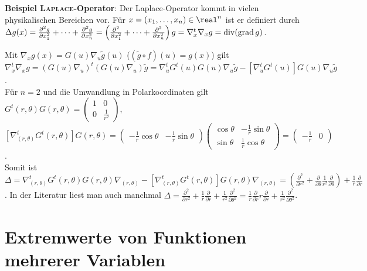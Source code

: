 \linie

\textbf{Beispiel \textsc{Laplace}-Operator}:
Der Laplace-Operator kommt in vielen physikalischen Bereichen vor.
Für $x = (x_1, \dotsc, x_n) \in \real^n$ ist er definiert durch \\
$\Delta g(x) = \frac{\partial^2 g}{\partial x_1^2} + \dotsb +
\frac{\partial^2 g}{\partial x_n^2} =
\left(\frac{\partial^2}{\partial x_1^2} + \dotsb +
\frac{\partial^2}{\partial x_n^2}\right) g = \nabla_x^t \nabla_x g =
\operatorname{div}(\operatorname{grad} g)$.

Mit $\nabla_x g(x) = G(u) \nabla_u \widetilde{g}(u)$
($(\widetilde{g} \circ f)(u) = g(x)$) gilt \\
$\nabla_x^t \nabla_x g = (G(u) \nabla_u)^t (G(u) \nabla_u) \widetilde{g} =
\nabla_u^t G^t(u) G(u) \nabla_u \widetilde{g} -
[\nabla_u^t G^t(u)] G(u) \nabla_u \widetilde{g}$. \\
Für $n = 2$ und die Umwandlung in Polarkoordinaten gilt
$G^t(r, \theta) G(r, \theta) = \begin{pmatrix}1 & 0 \\
0 & \frac{1}{r^2}\end{pmatrix}$, \\
$[\nabla_{(r,\theta)}^t G^t(r, \theta)] G(r, \theta) =
\begin{pmatrix}-\frac{1}{r} \cos \theta &
-\frac{1}{r} \sin \theta\end{pmatrix} \begin{pmatrix}
\cos \theta & -\frac{1}{r} \sin \theta \\
\sin \theta & \frac{1}{r} \cos \theta\end{pmatrix} =
\begin{pmatrix}-\frac{1}{r} & 0\end{pmatrix}$. \\
Somit ist
$\Delta = \nabla_{(r,\theta)}^t G^t(r, \theta) G(r, \theta) \nabla_{(r,\theta)}
- [\nabla_{(r,\theta)}^t G^t(r, \theta)] G(r, \theta) \nabla_{(r,\theta)} =
\left(\frac{\partial^2}{\partial r^2} + \frac{\partial}{\partial \theta}
\frac{1}{r^2} \frac{\partial}{\partial \theta}\right) + \frac{1}{r}
\frac{\partial}{\partial r}$.
In der Literatur liest man auch manchmal
$\Delta = \frac{\partial^2}{\partial r^2} +
\frac{1}{r} \frac{\partial}{\partial r} +
\frac{1}{r^2} \frac{\partial^2}{\partial \theta^2} =
\frac{1}{r} \frac{\partial}{\partial r} r \frac{\partial}{\partial r} +
\frac{1}{r^2} \frac{\partial^2}{\partial \theta^2}$.

\pagebreak

\section{%
    Extremwerte von Funktionen mehrerer Variablen%
}

